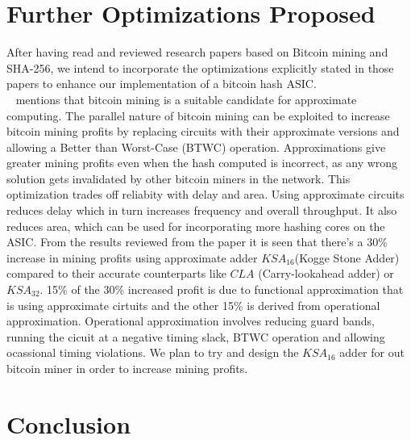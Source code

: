 \section{Further Optimizations Proposed}
After having read and reviewed research papers based on Bitcoin mining and SHA-256, we intend to incorporate the optimizations explicitly stated in those papers to enhance our implementation of a bitcoin hash ASIC. 
\\~\cite{} mentions that bitcoin mining is a suitable candidate for approximate computing. The parallel nature of bitcoin mining can be exploited to increase bitcoin mining profits by replacing circuits with their approximate versions and allowing a Better than Worst-Case (BTWC) operation. Approximations give greater mining profits even when the hash computed is incorrect, as any wrong solution gets invalidated by other bitcoin miners in the network. This optimization trades off reliabity with delay and area. Using approximate circuits reduces delay which in turn increases frequency and overall throughput. It also reduces area, which can be used for incorporating more hashing cores on the ASIC. From the results reviewed from the paper it is seen that there's a 30\% increase in mining profits using approximate adder $KSA_{16}$(Kogge Stone Adder) compared to their accurate counterparts like $CLA$ (Carry-lookahead adder) or $KSA_{32}$. 15\% of the 30\% increased profit is due to functional approximation that is using approximate cirtuits and the other 15\% is derived from operational approximation. Operational approximation involves reducing guard bands, running the cicuit at a negative timing slack, BTWC operation and allowing ocassional timing violations. We plan to try and design the $KSA_{16}$ adder for out bitcoin miner in order to increase mining profits.  

\section{Conclusion}

